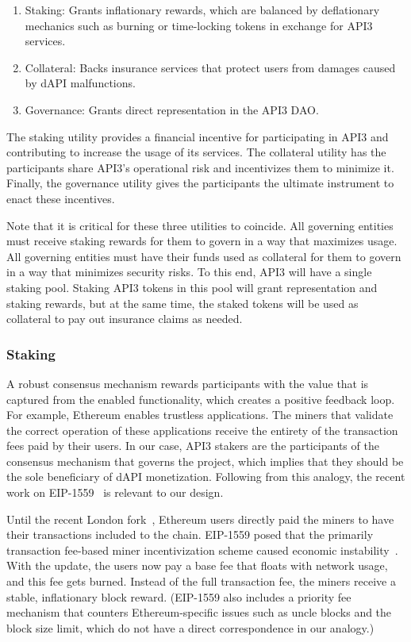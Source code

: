 \documentclass[11pt]{article}
\begin{document}
\begin{enumerate}
    \item Staking: Grants inflationary rewards, which are balanced by deflationary mechanics such as burning or time-locking tokens in exchange for API3 services.
    \item Collateral: Backs insurance services that protect users from damages caused by dAPI malfunctions.
    \item Governance: Grants direct representation in the API3 DAO.
\end{enumerate}

The staking utility provides a financial incentive for participating in API3 and contributing to increase the usage of its services.
The collateral utility has the participants share API3’s operational risk and incentivizes them to minimize it.
Finally, the governance utility gives the participants the ultimate instrument to enact these incentives.

Note that it is critical for these three utilities to coincide.
All governing entities must receive staking rewards for them to govern in a way that maximizes usage.
All governing entities must have their funds used as collateral for them to govern in a way that minimizes security risks.
To this end, API3 will have a single staking pool.
Staking API3 tokens in this pool will grant representation and staking rewards, but at the same time, the staked tokens will be used as collateral to pay out insurance claims as needed.

\subsubsection{Staking}
\label{sec:staking}

A robust consensus mechanism rewards participants with the value that is captured from the enabled functionality, which creates a positive feedback loop.
For example, Ethereum enables trustless applications.
The miners that validate the correct operation of these applications receive the entirety of the transaction fees paid by their users.
In our case, API3 stakers are the participants of the consensus mechanism that governs the project, which implies that they should be the sole beneficiary of dAPI monetization.
Following from this analogy, the recent work on EIP-1559~\cite{eip1559} is relevant to our design.

Until the recent London fork~\cite{london}, Ethereum users directly paid the miners to have their transactions included to the chain.
EIP-1559 posed that the primarily transaction fee-based miner incentivization scheme caused economic instability~\cite{roughgarden:2020}.
With the update, the users now pay a base fee that floats with network usage, and this fee gets burned.
Instead of the full transaction fee, the miners receive a stable, inflationary block reward.
(EIP-1559 also includes a priority fee mechanism that counters Ethereum-specific issues such as uncle blocks and the block size limit, which do not have a direct correspondence in our analogy.)
\end{document}

